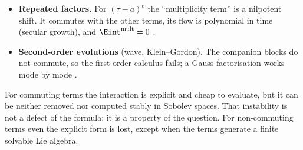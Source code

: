 \begin{caution}[title={Other ways commutativity is lost}]
\begin{itemize}
\item \textbf{Repeated factors.} For $(\tau-a)^e$ the ``multiplicity term'' is a nilpotent shift. It commutes with the other terms, its flow is polynomial in time (secular growth), and $\Eint^{\mathrm{mult}}=0$  \pw.
\item \textbf{Second-order evolutions} (wave, Klein--Gordon). The companion blocks do not commute, so the first-order calculus fails; a Gauss factorisation works mode by mode  \proved.
\end{itemize}
\end{caution}

\begin{keypoint}
For commuting terms the interaction is explicit and cheap to evaluate, but it can be neither removed nor computed stably in Sobolev spaces. That instability is not a defect of the formula: it is a property of the question. For non-commuting terms even the explicit form is lost, except when the terms generate a finite solvable Lie algebra.
\end{keypoint}

